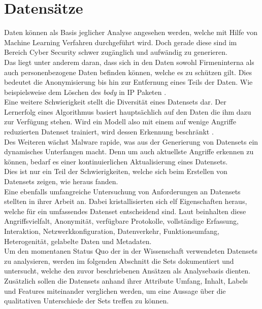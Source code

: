 \documentclass[
    12pt, %
    DIV10,
    ngerman, %
    a4paper, %
    oneside, %
    titlepage, %
    parskip=half, %
    headings=normal, %
    listof=totoc, %
    bibliography=totoc, %
    index=totoc, %
    captions=tableheading, %
    final %
]{scrreprt}
\begin{document}
\chapter{Datensätze}\label{ch:d}
Daten können als Basis jeglicher Analyse angesehen werden, welche mit Hilfe von Machine Learning Verfahren durchgeführt wird. Doch gerade diese sind im Bereich Cyber Security schwer zugänglich und aufwändig zu generieren.\\ 
Das liegt unter anderem daran, dass sich in den Daten sowohl Firmeninterna als auch personenbezogene Daten befinden können, welche es zu schützen gilt. Dies bedeutet die Anonymisierung bis hin zur Entfernung eines Teils der Daten. Wie beispielsweise dem Löschen des \emph{body} in IP Paketen \parencite{Uramova2018}.\\
Eine weitere Schwierigkeit stellt die Diversität eines Datensets dar. Der Lernerfolg eines Algorithmus basiert hauptsächlich auf den Daten die ihm dazu zur Verfügung stehen. Wird ein Modell also mit einem auf wenige Angriffe reduzierten Datenset trainiert, wird dessen Erkennung beschränkt \parencite{Hillary2017}.\\
Des Weiteren wächst Malware rapide, was aus der Generierung von Datensets ein dynamisches Unterfangen macht. Denn um auch aktuellste Angriffe erkennen zu können, bedarf es einer kontinuierlichen Aktualisierung eines Datensets.\\
Dies ist nur ein Teil der Schwierigkeiten, welche sich beim Erstellen von Datensets zeigen, wie \textcite{Uramova2018} heraus fanden.\\
Eine ebenfalls umfangreiche Untersuchung von Anforderungen an Datensets stellten \textcite{7885840} in ihrer Arbeit an. Dabei kristallisierten sich elf Eigenschaften heraus, welche für ein umfassendes Datenset entscheidend sind. Laut \textcite{7885840} beinhalten diese Angriffsvielfalt, Anonymität, verfügbare Protokolle, vollständige Erfassung, Interaktion, Netzwerkkonfiguration, Datenverkehr, Funktionsumfang, Heterogenität, gelabelte Daten und Metadaten.\\
Um den momentanen Status Quo der in der Wissenschaft verwendeten Datensets zu analysieren, werden im folgenden Abschnitt die Sets dokumentiert und untersucht, welche den zuvor beschriebenen Ansätzen als Analysebasis dienten. Zusätzlich sollen die Datensets anhand ihrer Attribute Umfang, Inhalt, Labels und Features miteinander verglichen werden, um eine Aussage über die qualitativen Unterschiede der Sets treffen zu können.
\end{document}
